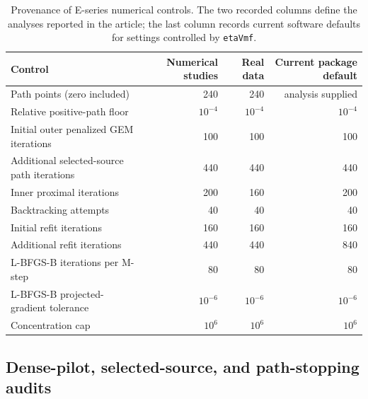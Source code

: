 \documentclass[preprint,12pt,authoryear]{elsarticle}
\begin{document}
\begin{table}[H]
\centering
\scriptsize
\caption{Provenance of E-series numerical controls. The two recorded columns
define the analyses reported in the article; the last column records current
software defaults for settings controlled by \texttt{etaVmf}.}
\label{tab:s-control-provenance}
\begin{tabular}{lrrr}
\toprule
Control & Numerical studies & Real data & Current package default \\
\midrule
Path points (zero included) & 240 & 240 & analysis supplied \\
Relative positive-path floor & $10^{-4}$ & $10^{-4}$ & $10^{-4}$ \\
Initial outer penalized GEM iterations & 100 & 100 & 100 \\
Additional selected-source path iterations & 440 & 440 & 440 \\
Inner proximal iterations & 200 & 160 & 200 \\
Backtracking attempts & 40 & 40 & 40 \\
Initial refit iterations & 160 & 160 & 160 \\
Additional refit iterations & 440 & 440 & 840 \\
L-BFGS-B iterations per M-step & 80 & 80 & 80 \\
L-BFGS-B projected-gradient tolerance & $10^{-6}$ & $10^{-6}$ & $10^{-6}$ \\
Concentration cap & $10^6$ & $10^6$ & $10^6$ \\
\bottomrule
\end{tabular}
\end{table}

\subsection{Dense-pilot, selected-source, and path-stopping audits}
\label{sec:s-heuristic-audit}
\end{document}
